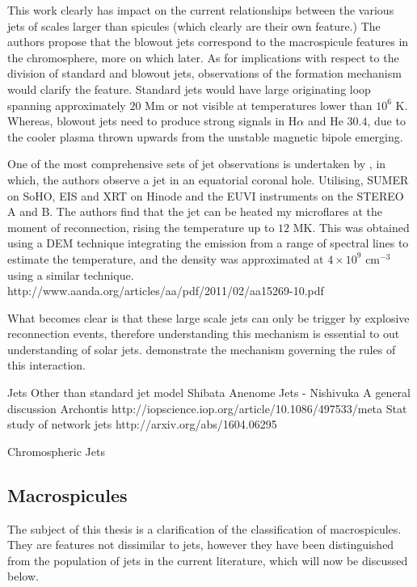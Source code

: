 This work clearly has impact on the current relationships between the various jets of scales larger than spicules (which clearly are their own feature.)
The authors propose that the blowout jets correspond to the macrospicule features in the chromosphere, more on which later.
As for implications with respect to the division of standard and blowout jets, observations of the formation mechanism would clarify the feature.
Standard jets would have large originating loop spanning approximately $20$ Mm or not visible at temperatures lower than  $10^6$ K.
Whereas, blowout jets need to produce strong signals in H$\alpha$ and He $30.4$, due to the cooler plasma thrown upwards from the unstable magnetic bipole emerging.

One of the most comprehensive sets of jet observations is undertaken by \cite{Majarska2011}, in which, the authors observe a jet in an equatorial coronal hole.
Utilising, SUMER on SoHO, EIS and XRT on Hinode and the EUVI instruments on the STEREO A and B.
The authors find that the jet can be heated my microflares at the moment of reconnection, rising the temperature up to $12$ MK.
This was obtained using a DEM technique integrating the emission from a range of spectral lines to estimate the temperature, and the density was approximated at $4 \times 10^9$ cm$^{-3}$ using a similar technique.
http://www.aanda.org/articles/aa/pdf/2011/02/aa15269-10.pdf


What becomes clear is that these large scale jets can only be trigger by explosive reconnection events, therefore understanding this mechanism is essential to out understanding of solar jets.
\cite{Archontis2005} demonstrate the mechanism governing the rules of this interaction.









Jets
Other than standard jet model Shibata
Anenome Jets - Nishivuka
A general discussion Archontis http://iopscience.iop.org/article/10.1086/497533/meta
Stat study of network jets http://arxiv.org/abs/1604.06295


Chromospheric Jets




\subsection{Macrospicules}


The subject of this thesis is a clarification of the classification of macrospicules. 
They are features not dissimilar to jets, however they have been distinguished from the population of jets in the current literature, which will now be discussed below.

